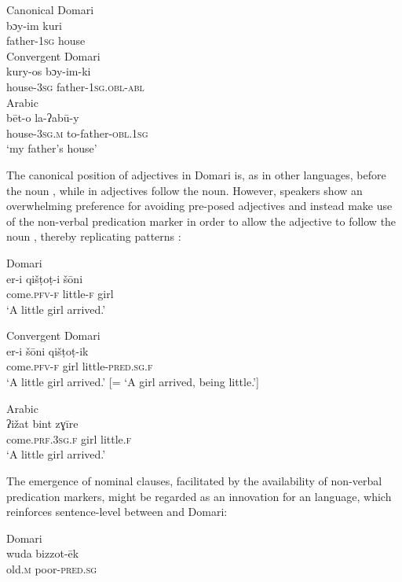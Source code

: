 \documentclass[output=paper]{langsci/langscibook}
\begin{document}
\ea
\ea
{{Canonical} Domari}\\
\gll bɔy-im kuri    \\
     father-\textsc{1sg} house\\ \label{kuri}
\ex
{Convergent Domari}\\
\gll kury-os bɔy-im-ki  \\
       house-\textsc{3sg} father-\textsc{1sg.obl-abl}\\ \label{boy}
\ex
{Arabic}\\
\gll bēt-o la-ʔabū-y  \\
       house-\textsc{3sg.m} to-father-\textsc{obl.1sg}\\
\glt   ‘my father’s house’ \label{bett}
\z
\z

The canonical position of adjectives in Domari is, as in other  languages, before the noun , while in  adjectives follow the noun. However, speakers show an overwhelming preference for avoiding pre-posed adjectives and instead make use of the non-verbal predication marker in order to allow the adjective to follow the noun , thereby replicating   patterns :

\ea\label{girls}
\ea
{ Domari}\\
\gll er-i qišṭoṭ-i šōni  \\
       come.\textsc{pfv-f} little-\textsc{f} girl\\
\glt   ‘A little girl arrived.’ \label{girla}



\ex
{Convergent Domari}\\
\gll   er-i šōni qišṭoṭ-ik  \\
       come.\textsc{pfv-f} girl little-\textsc{pred.sg.f}\\
\glt   ‘A little girl arrived.’ [= ‘A girl arrived, being little.’] \label{girlb}

\ex
{Arabic}\\
\gll ʔižat bint zɣīre  \\
       come.\textsc{prf.3sg.f} girl little.\textsc{f}\\
\glt   ‘A little girl arrived.’ \label{girlc}
\z
\z

The emergence of nominal clauses, facilitated by the availability of non-verbal predication markers, might be regarded as an innovation for an  language, which reinforces sentence-level  between  and Domari:

\ea
\ea
{Domari}\\
\gll wuda bizzot-ēk  \\
     old.\textsc{m} poor-\textsc{pred.sg}\\
     
\end{document}
